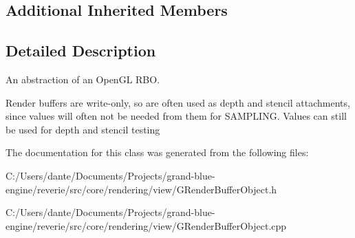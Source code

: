 \subsection*{Additional Inherited Members}


\subsection{Detailed Description}
An abstraction of an Open\+GL R\+BO. 

Render buffers are write-\/only, so are often used as depth and stencil attachments, since values will often not be needed from them for S\+A\+M\+P\+L\+I\+NG. Values can still be used for depth and stencil testing 

The documentation for this class was generated from the following files\+:\begin{DoxyCompactItemize}
\item 
C\+:/\+Users/dante/\+Documents/\+Projects/grand-\/blue-\/engine/reverie/src/core/rendering/view/G\+Render\+Buffer\+Object.\+h\item 
C\+:/\+Users/dante/\+Documents/\+Projects/grand-\/blue-\/engine/reverie/src/core/rendering/view/G\+Render\+Buffer\+Object.\+cpp\end{DoxyCompactItemize}
